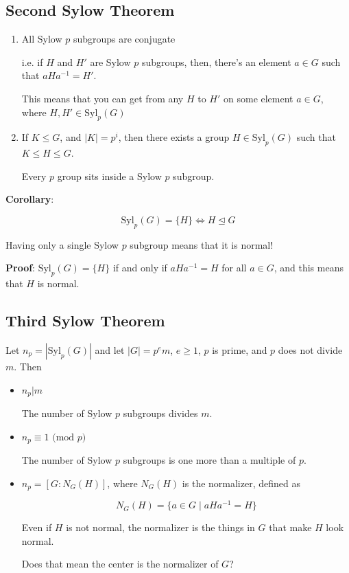 \documentclass[12pt]{article}
\def\Syl{\text{Syl}}
\renewcommand{\mod}[1]{
  \text{ (mod $#1$) }
}
\begin{document}
\subsection{Second Sylow Theorem}

\begin{enumerate}
  \item All Sylow $p$ subgroups are conjugate

    i.e. if $H$ and $H'$ are Sylow $p$ subgroups, then, there's an element $a
    \in G$ such that $aHa^{-1} = H'$.

    This means that you can get from any $H$ to $H'$ on some element $a \in G$,
    where $H, H' \in \Syl_p(G)$

  \item If $K \le G$, and $|K| = p^i$, then there exists a group $H \in
    \Syl_p(G)$ such that $K \le H \le G$.

    Every $p$ group sits inside a Sylow $p$ subgroup.
\end{enumerate}

{\bf Corollary}:

\[
  \Syl_p(G) = \{H\} \Leftrightarrow H \trianglelefteq G
\]

Having only a single Sylow $p$ subgroup means that it is normal!

{\bf Proof}: $\Syl_p(G) = \{H\}$ if and only if $aHa^{-1} = H$ for all $a \in G$,
and this means that $H$ is normal.

\subsection{Third Sylow Theorem}

Let $n_p = |\Syl_p(G)|$ and let $|G| = p^e m$, $e \ge 1$, $p$ is prime, and $p$
does not divide $m$. Then

\begin{itemize}
  \item $n_p | m$

    The number of Sylow $p$ subgroups divides $m$.

  \item $n_p \equiv 1 \mod p$

    The number of Sylow $p$ subgroups is one more than a multiple of $p$.

  \item $n_p = [G : N_G(H)]$, where $N_G(H)$ is the normalizer, defined as

    \[
      N_G(H) = \{a \in G \mid aHa^{-1} = H \}
    \]

    Even if $H$ is not normal, the normalizer is the things in $G$ that make $H$
    look normal.

    \QUESTION{} Does that mean the center is the normalizer of $G$?
\end{itemize}
\end{document}
